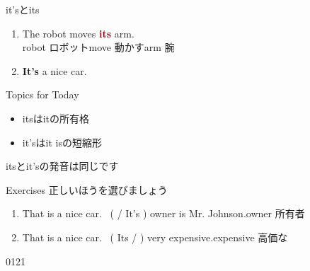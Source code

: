 \documentclass[aspectratio=169,xcolor={dvipsnames,table}]{beamer}
\begin{document}
\begin{frame}[plain]{it'sとits}
\Large
 \begin{enumerate}
  \item The robot moves \textcolor{Maroon}{\bfseries its} arm.\\
\hfill{\scriptsize robot  ロボット\hspace{1\zw}move  動かす\hspace{1\zw}arm  腕}
  \item \textcolor{NavyBlue}{\bfseries It's} a nice car.
 \end{enumerate}
\normalsize

\vfill

\begin{block}{Topics for Today}
 \begin{itemize}[circle]
  \item itsはitの所有格
  \item {it's}は{it is}の短縮形
 \end{itemize}

\hfill{}itsとit'sの発音は同じです \hspace*{1\zw}
     \end{block}

\end{frame}
\begin{frame}[plain]{Exercises}
 正しいほうを選びましょう

 \begin{enumerate}
  \item That is a nice car.\,\,\,\,\,(  / It's ) owner is Mr. Johnson.\hfill{\scriptsize owner  所有者}
  \item That is a nice car.\,\,\,\,\,(  Its /  ) very expensive.\hfill{\scriptsize expensive  高価な}
 \end{enumerate}

\vfill

\hfill{\tiny 0121}\,{\scriptsize {}}
\end{frame}

\end{document}
